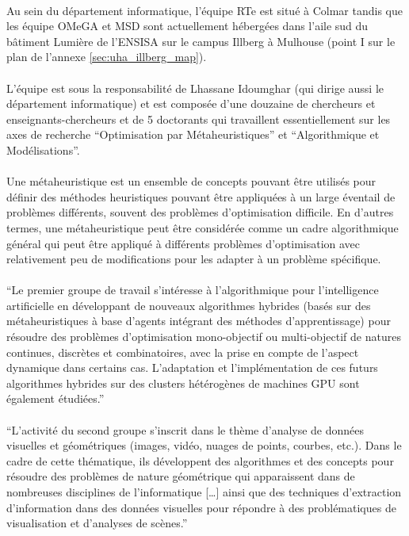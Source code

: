 \documentclass[a4paper,11pt,twoside,french,report]{../common/simplem}
\begin{document}
				\paragraph*{}
					Au sein du département informatique, l'équipe \gls{RTe} est situé à Colmar tandis que les équipe \gls{OMeGA} et \gls{MSD} sont actuellement hébergées dans l'aile sud du bâtiment Lumière de l'\gls{ENSISA} sur le campus Illberg à Mulhouse (point I sur le plan de l'annexe \ref{sec:uha_illberg_map}).
				\paragraph*{}
					L'équipe est sous la responsabilité de Lhassane Idoumghar (qui dirige aussi le département informatique) et est composée d'une douzaine de chercheurs et enseignants-chercheurs et de 5 doctorants qui travaillent essentiellement sur les axes de recherche ``Optimisation par Métaheuristiques'' et ``Algorithmique et Modélisations''.
				\paragraph*{}
					Une métaheuristique est un ensemble de concepts pouvant être utilisés pour définir des méthodes heuristiques pouvant être appliquées à un large éventail de problèmes différents, souvent des problèmes d’optimisation difficile. En d'autres termes, une métaheuristique peut être considérée comme un cadre algorithmique général qui peut être appliqué à différents problèmes d'optimisation avec relativement peu de modifications pour les adapter à un problème spécifique.
				\paragraph*{}
					``Le premier groupe de travail s’intéresse à l’algorithmique pour l’intelligence artificielle en développant de nouveaux algorithmes hybrides (basés sur des métaheuristiques à base d’agents intégrant des méthodes d’apprentissage) pour résoudre des problèmes d'optimisation mono-objectif ou multi-objectif de natures continues, discrètes et combinatoires, avec la prise en compte de l’aspect dynamique dans certains cas. L’adaptation et l’implémentation de ces futurs algorithmes hybrides sur des clusters hétérogènes de machines GPU sont également étudiées.''~\cite{IRIMAS_OMeGA}
				\paragraph*{}
					``L’activité du second groupe s’inscrit dans le thème d’analyse de données visuelles et géométriques (images, vidéo, nuages de points, courbes, etc.). Dans le cadre de cette thématique, ils développent des algorithmes et des concepts pour résoudre des problèmes de nature géométrique qui apparaissent dans de nombreuses disciplines de l’informatique [\ldots] ainsi que des techniques d’extraction d’information dans des données visuelles pour répondre à des problématiques de visualisation et d’analyses de scènes.''~\cite{IRIMAS_OMeGA}
\end{document}
